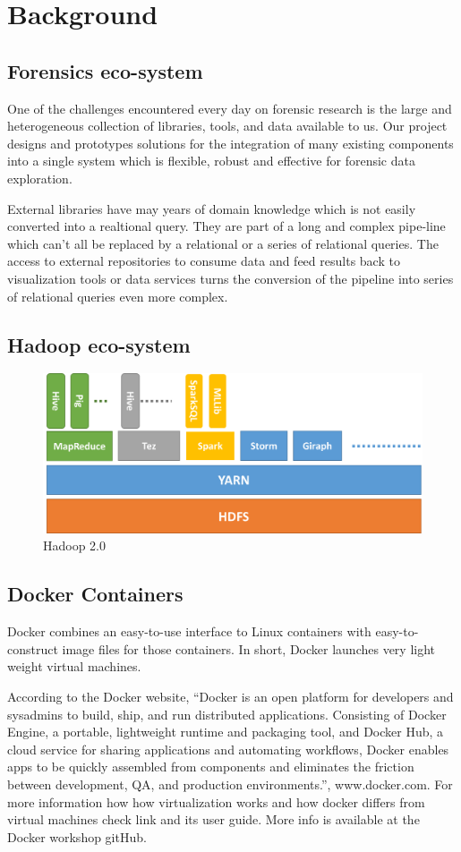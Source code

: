 \section{Background}
\label{background}

\subsection{Forensics eco-system}
One of the challenges encountered every day on forensic research is the large and heterogeneous collection
of libraries, tools, and data available to us. Our project designs and prototypes solutions for the
integration of many existing components into a single system which is flexible, robust and effective for
forensic data exploration.

External libraries have may years of domain knowledge which is not easily converted into a
realtional query. They are part of a long and complex pipe-line which can't all be replaced
by a relational or a series of relational queries. The access to external repositories to
consume data and feed results back to visualization tools or data services turns the
conversion of the pipeline into series of relational queries even more complex.

\subsection{Hadoop eco-system}

\begin{figure}[lb]
\centering
\includegraphics[width=.48\textwidth]{fig/hadoop_2.png}
\caption{Hadoop 2.0}
\label{haddop_2}
\end{figure}


\subsection{Docker Containers}
Docker combines an easy-to-use interface to Linux containers with easy-to-construct image files for those containers. In short, Docker launches very light weight virtual machines.

According to the Docker website, “Docker is an open platform for developers and sysadmins to build, ship, and run distributed applications. Consisting of Docker Engine, a portable, lightweight runtime and packaging tool, and Docker Hub, a cloud service for sharing applications and automating workflows, Docker enables apps to be quickly assembled from components and eliminates the friction between development, QA, and production environments.”, www.docker.com. For more information how how virtualization works and how docker differs from virtual machines check link and its user guide. More info is available at the Docker workshop gitHub.


